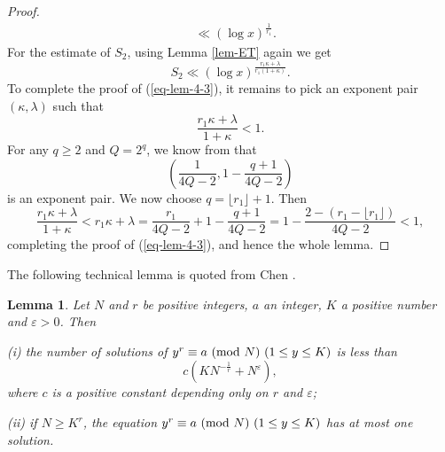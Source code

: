 \documentclass[12pt,a4paper,reqno]{amsart}
\numberwithin{equation}{section}
\def\pmod #1{\ ({\rm{mod}}\ #1)}
\theoremstyle{plain}
\newtheorem{lemma}{Lemma}
\theoremstyle{definition}
\begin{document}
\begin{proof}
\begin{align*}
&\ll (\log x)^{\frac{1}{r_1}}.
\end{align*}
For the estimate of $S_2$, using Lemma \ref{lem-ET} again we get
$$
S_2\ll (\log x)^{\frac{r_1\kappa+\lambda}{r_1(1+\kappa)}}.
$$
To complete the proof of (\ref{eq-lem-4-3}), it remains to pick an exponent pair $(\kappa, \lambda)$ such that
$$
\frac{r_1\kappa+\lambda}{1+\kappa}<1.
$$
For any $q\ge 2$ and $Q=2^q$, we know from \cite[p. 60]{Graham} that
$$
\left(\frac{1}{4Q-2},1-\frac{q+1}{4Q-2}\right)
$$
is an exponent pair. We now choose $q=\lfloor r_1\rfloor+1$. Then
$$
\frac{r_1\kappa+\lambda}{1+\kappa}<r_1\kappa+\lambda=\frac{r_1}{4Q-2}+1-\frac{q+1}{4Q-2}=1-\frac{2-(r_1-\lfloor r_1\rfloor)}{4Q-2}<1,
$$
completing the proof of (\ref{eq-lem-4-3}), and hence the whole lemma.
\end{proof}

The following technical lemma is quoted from Chen \cite[Theorem 3.1]{Chen-Xu}.

\begin{lemma}\label{lem-Chen}
Let $N$ and $r$ be positive integers, $a$ an integer, $K$ a positive number and $\varepsilon>0$. Then

{\rm (i)} the number of solutions of $y^{r}\equiv a\pmod{N}~(1\le y\le K)$ is less than 
$$
c\left(KN^{-\frac{1}{r}}+N^\varepsilon\right),
$$
where $c$ is a positive constant depending only on $r$ and $\varepsilon$;

{\rm (ii)} if $N\ge K^r$, the equation $y^{r}\equiv a\pmod{N}~(1\le y\le K)$ has at most one solution.
\end{lemma}
\end{document}
